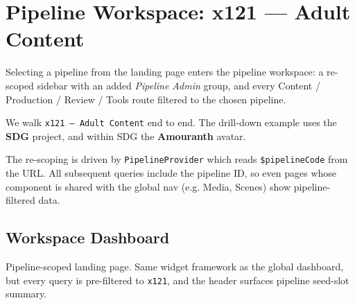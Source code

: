 \chapter{Pipeline Workspace: x121 — Adult Content}
\label{ch:pipeline-workspace}

Selecting a pipeline from the landing page enters the pipeline workspace: a
re-scoped sidebar with an added \emph{Pipeline Admin} group, and every Content
/ Production / Review / Tools route filtered to the chosen pipeline.

We walk \texttt{x121 — Adult Content} end to end. The drill-down example uses
the \textbf{SDG} project, and within SDG the \textbf{Amouranth} avatar.


\begin{designnote}
The re-scoping is driven by \texttt{PipelineProvider} which reads
\texttt{\$pipelineCode} from the URL. All subsequent queries include the
pipeline ID, so even pages whose component is shared with the global nav
(e.g. Media, Scenes) show pipeline-filtered data.
\end{designnote}

\section{Workspace Dashboard}
\label{sec:ws-dashboard}

Pipeline-scoped landing page. Same widget framework as the global dashboard, but
every query is pre-filtered to \texttt{x121}, and the header surfaces pipeline
seed-slot summary.


\begin{itemize}
\end{itemize}

